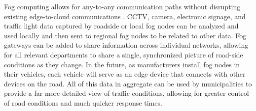 \documentclass{article}
\begin{document}
Fog computing allows for any-to-any communication paths without disrupting existing edge-to-cloud communications \cite{outofthefog2017}. CCTV, camera, electronic signage, and traffic light data captured by roadside or local fog nodes can be analyzed and used locally and then sent to regional fog nodes to be related to other data. Fog gateways can be added to share information across individual networks, allowing for all relevant departments to share a single, synchronized picture of road-side conditions as they change. In the future, as manufacturers install fog nodes in their vehicles, each vehicle will serve as an edge device that connects with other devices on the road. All of this data in aggregate can be used by municipalities to provide a far more detailed view of traffic conditions, allowing for greater control of road conditions and much quicker response times.

\pagebreak

\renewcommand{\refname}{\section{References}}


\end{document}
